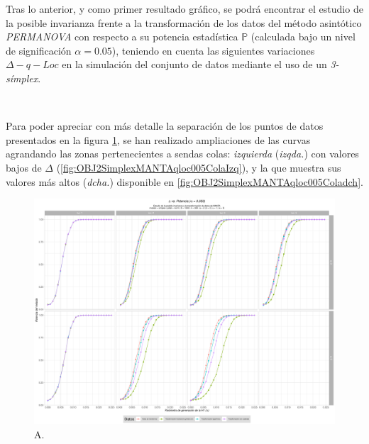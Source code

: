 \documentclass[IB,BIB]{TFUOC}%
\begin{document}
Tras lo anterior, y como primer resultado gráfico, se podrá encontrar el estudio de la posible invarianza frente a la transformación de los datos del método asintótico \textit{PERMANOVA} con respecto a su potencia estadística \( \mathbb P \) (calculada bajo un nivel de significación \( \alpha = \text{0.05} \)), teniendo en cuenta las siguientes variaciones \( \Delta - q - Loc \) en la simulación del conjunto de datos mediante el uso de un \textit{3-símplex}.

\

Para poder apreciar con más detalle la separación de los puntos de datos presentados en la figura \ref{fig:OBJ2SimplexMANTAqloc005}, se han realizado ampliaciones de las curvas agrandando las zonas pertenecientes a sendas colas: \textit{izquierda} (\textit{izqda.}) con valores bajos de \( \Delta \) (\ref{fig:OBJ2SimplexMANTAqloc005ColaIzq}), y la que muestra sus valores más altos (\textit{dcha.}) disponible en \ref{fig:OBJ2SimplexMANTAqloc005Coladch}.

\begin{figure}[!htbp]
\hspace*{-0.8cm} %
    \centering
    \includegraphics[scale=.45]{OBJ2SimplexMANTAqloc005.pdf}
    \caption{\scriptsize{A.}}
    \label{fig:OBJ2SimplexMANTAqloc005}
\end{figure}
\end{document}
